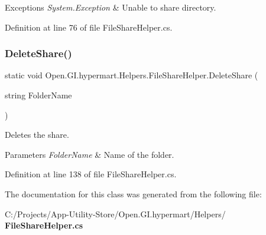 \begin{DoxyExceptions}{Exceptions}
{\em System.\+Exception} & Unable to share directory.\\
\hline
\end{DoxyExceptions}


Definition at line 76 of file File\+Share\+Helper.\+cs.

\mbox{\label{class_open_1_1_g_i_1_1hypermart_1_1_helpers_1_1_file_share_helper_afa333f49f2689e9a64708c27450582ef}} 
\subsubsection{Delete\+Share()}
{\footnotesize\ttfamily static void Open.\+G\+I.\+hypermart.\+Helpers.\+File\+Share\+Helper.\+Delete\+Share (\begin{DoxyParamCaption}\item[{string}]{Folder\+Name }\end{DoxyParamCaption})\hspace{0.3cm}{\ttfamily [static]}}



Deletes the share. 


\begin{DoxyParams}{Parameters}
{\em Folder\+Name} & Name of the folder.\\
\hline
\end{DoxyParams}


Definition at line 138 of file File\+Share\+Helper.\+cs.



The documentation for this class was generated from the following file\+:\begin{DoxyCompactItemize}
\item 
C\+:/\+Projects/\+App-\/\+Utility-\/\+Store/\+Open.\+G\+I.\+hypermart/\+Helpers/\textbf{ File\+Share\+Helper.\+cs}\end{DoxyCompactItemize}
